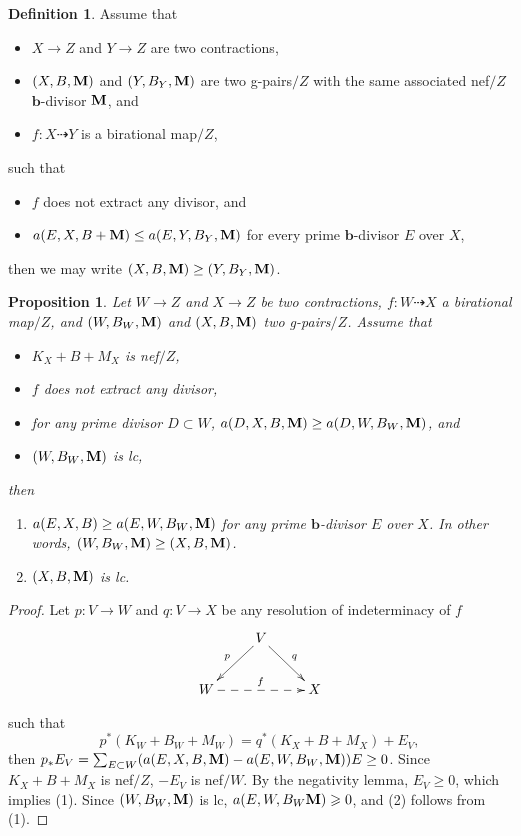 \documentclass[11pt]{amsart}
\numberwithin{equation}{section}
\newcommand{\bb}{\bm{b}}
\newcommand{\Mm}{{\bf{M}}}
\newtheorem{prop}[thm]{Proposition}
\theoremstyle{definition}
\newtheorem{defn}[thm]{Definition}
\theoremstyle{definition}
\theoremstyle{definition}
\begin{document}
\begin{defn}
Assume that
\begin{itemize}
    \item $X\rightarrow Z$ and $Y\rightarrow Z$ are two contractions,
    \item $(X,B,\Mm)$ and $(Y,B_Y,\Mm)$ are two g-pairs$/Z$ with the same associated nef$/Z$ $\bb$-divisor $\Mm$, and
    \item $f: X\dashrightarrow Y$ is a birational map$/Z$,
\end{itemize}
such that
\begin{itemize}
    \item $f$ does not extract any divisor, and
    \item $a(E,X,B+\Mm)\leq a(E,Y,B_Y,\Mm)$ for every prime $\bb$-divisor $E$ over $X$,
\end{itemize}
then we may write $(X,B,\Mm)\geq (Y,B_Y,\Mm)$.
\end{defn}

\begin{prop}\label{prop: g lc prop} 
Let $W\rightarrow Z$ and $X\rightarrow Z$ be two contractions, $f:W\dashrightarrow X$ a birational map$/Z$, and $(W,B_W,\Mm)$ and $(X,B,\Mm)$ two g-pairs$/Z$. Assume that
\begin{itemize}
    \item $K_X+B+M_X$ is nef$/Z$,
    \item $f$ does not extract any divisor,
    \item for any prime divisor $D\subset W$, $a(D,X,B,\Mm )\geq a(D,W,B_W,\Mm)$, and
    \item $(W,B_W,\Mm)$ is lc,
\end{itemize}
then
\begin{enumerate}
    \item $a(E,X,B)\geq a(E,W,B_{W},\Mm)$ for any prime $\bb$-divisor $E$ over $X$. In other words, $(W,B_{W},\Mm)\geq (X,B,\Mm)$.
    \item $(X,B,\Mm)$ is lc.
\end{enumerate}
\end{prop}

\begin{proof}
Let 
$p: V\rightarrow W$ and $q: V\rightarrow X$ be any resolution of indeterminacy of $f$ 
\[
  \xymatrix{
 & V\ar@{->}[dl]_{p}\ar@{->}[dr]^{q}& \\
      W\ar@{-->}[rr]^{f}   &  & X \\
    }
\]


such that
$$p^*(K_W+B_W+M_W)=q^*(K_X+B+M_X)+E_V,$$
then $p_*E_V=\sum_{E\subset W}(a(E,X,B,\Mm)-a(E,W,B_W,\Mm))E\geq 0$. Since $K_X+B+M_X$ is nef$/Z$, $-E_V$ is nef$/W$. By the negativity lemma, $E_V\geq 0$, which implies (1). 
Since $(W,B_W,\Mm)$ is lc, $a(E,W,B_W\Mm) \geqslant 0 $, and (2) follows from (1).  
\end{proof}
\end{document}
